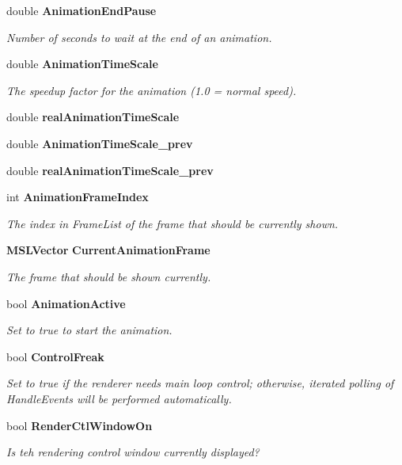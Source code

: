 \begin{CompactItemize}
double {\bf Animation\-End\-Pause}
\begin{CompactList}\small\item\em Number of seconds to wait at the end of an animation.\item\end{CompactList}\item 
double {\bf Animation\-Time\-Scale}
\begin{CompactList}\small\item\em The speedup factor for the animation (1.0 = normal speed).\item\end{CompactList}\item 
double {\bf real\-Animation\-Time\-Scale}
\item 
double {\bf Animation\-Time\-Scale\_\-prev}
\item 
double {\bf real\-Animation\-Time\-Scale\_\-prev}
\item 
int {\bf Animation\-Frame\-Index}
\begin{CompactList}\small\item\em The index in Frame\-List of the frame that should be currently shown.\item\end{CompactList}\item 
{\bf MSLVector} {\bf Current\-Animation\-Frame}
\begin{CompactList}\small\item\em The frame that should be shown currently.\item\end{CompactList}\item 
bool {\bf Animation\-Active}
\begin{CompactList}\small\item\em Set to true to start the animation.\item\end{CompactList}\item 
bool {\bf Control\-Freak}
\begin{CompactList}\small\item\em Set to true if the renderer needs main loop control; otherwise, iterated polling of Handle\-Events will be performed automatically.\item\end{CompactList}\item 
bool {\bf Render\-Ctl\-Window\-On}
\begin{CompactList}\small\item\em Is teh rendering control window currently displayed?\item\end{CompactList}\item 

\end{CompactItemize}
